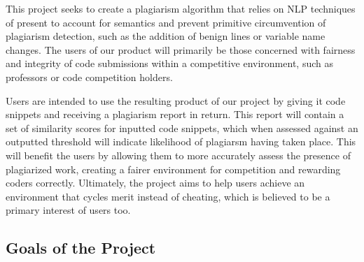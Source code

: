 \documentclass[12pt]{article}
\begin{document}
This project seeks to create a plagiarism algorithm that relies on NLP 
techniques of present to account for semantics and prevent primitive 
circumvention of plagiarism detection, such as the addition of benign lines or 
variable name changes. The users of our product will primarily be those 
concerned with fairness and integrity of code submissions within a competitive 
environment, such as professors or code competition holders. 

Users are intended to use the resulting product of our project by giving it
code snippets and receiving a plagiarism report in return. This report will
contain a set of similarity scores for inputted code snippets, which when 
assessed against an outputted threshold will indicate likelihood of plagiarsm
having taken place. This will benefit the users by allowing them to more 
accurately assess the presence of plagiarized work, creating a fairer environment
for competition and rewarding coders correctly. Ultimately, the project aims
to help users achieve an environment that cycles merit instead of cheating, 
which is believed to be a primary interest of users too.
\newpage
\subsection{Goals of the Project}
\end{document}
